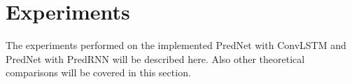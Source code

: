 \section{Experiments} \label{section::experiments}
 The experiments performed on the implemented PredNet with ConvLSTM and PredNet with PredRNN will be described here. Also other theoretical comparisons will be covered in this section.